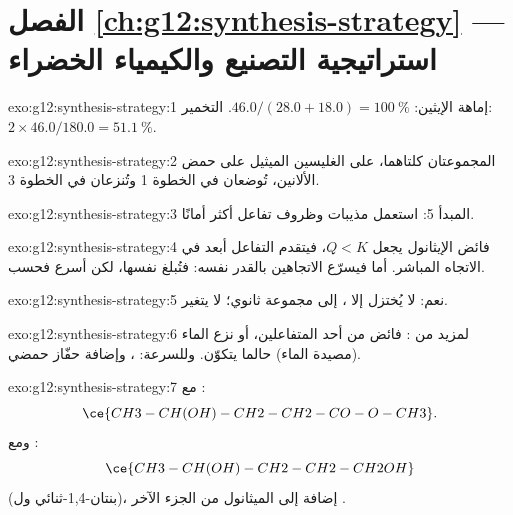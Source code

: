 \section*{الفصل \ref{ch:g12:synthesis-strategy} --- استراتيجية التصنيع والكيمياء الخضراء}

\begin{solution}{exo:g12:synthesis-strategy:1}
إماهة الإيثين: $46.0/(28.0 + 18.0) = \qty{100}{\percent}$. التخمير:
$2 \times 46.0/180.0 = \qty{51.1}{\percent}$.
\end{solution}

\begin{solution}{exo:g12:synthesis-strategy:2}
المجموعتان كلتاهما،  على  الغليسين  الميثيل على حمض
الألانين، تُوضعان في الخطوة 1 وتُنزعان في الخطوة 3.
\end{solution}

\begin{solution}{exo:g12:synthesis-strategy:3}
المبدأ 5: استعمل مذيبات وظروف تفاعل أكثر أمانًا.
\end{solution}

\begin{solution}{exo:g12:synthesis-strategy:4}
فائض الإيثانول يجعل $Q < K$، فيتقدم التفاعل أبعد في
الاتجاه المباشر. أما  فيسرّع الاتجاهين بالقدر نفسه: فتُبلغ
 نفسها، لكن أسرع فحسب.
\end{solution}

\begin{solution}{exo:g12:synthesis-strategy:5}
نعم: لا يُختزل إلا ، إلى مجموعة  ثانوي؛
 لا يتغير.
\end{solution}

\begin{solution}{exo:g12:synthesis-strategy:6}
لمزيد من : فائض من أحد المتفاعلين، أو نزع الماء (مصيدة الماء)
حالما يتكوّن. وللسرعة: ، وإضافة حفّاز حمضي.
\end{solution}

\begin{solution}{exo:g12:synthesis-strategy:7}
مع :
\[ \ce{CH3-CH(OH)-CH2-CH2-CO-O-CH3} . \]
ومع :
\[ \ce{CH3-CH(OH)-CH2-CH2-CH2OH} \]
(بنتان-1,4-ثنائي ول)، إضافة إلى الميثانول من الجزء الآخر .
\end{solution}


